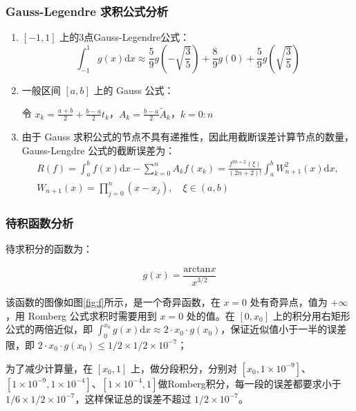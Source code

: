 \subsubsection{Gauss-Legendre 求积公式分析}

\begin{enumerate}[(1)]
    \item $[-1,1]$ 上的3点Gauss-Legendre公式：
    \begin{equation}
        \int_{-1}^1 g(x)\mathrm{d}x \approx \frac{5}{9}g(-\sqrt{\frac{3}{5}}) + \frac{8}{9}g(0) + \frac{5}{9}g(\sqrt{\frac{3}{5}})
    \end{equation}

    \item 一般区间 $[a,b]$ 上的 Gauss 公式：
    
    令 $x_k = \frac{a+b}{2}+\frac{b-a}{2}t_k$，$A_k = \frac{b-a}{2}\tilde{A}_k$，$k=0:n$

    \item 由于 Gauss 求积公式的节点不具有递推性，因此用截断误差计算节点的数量， Gauss-Lengdre 公式的截断误差为：
    \begin{multline}
        R(f) = \int _a^b f(x)\mathrm{d}x - \sum\nolimits_{k=0}^n A_kf(x_k) = \frac{f^{2n+2}(\xi)}{(2n+2)!} \int_a^b W_{n+1}^2(x)\mathrm{d}x, \\
        W_{n+1}(x) = \prod\nolimits_{j=0}^n (x-x_j), \quad \xi \in (a,b)
    \end{multline}

\end{enumerate}

\subsubsection{待积函数分析}

待求积分的函数为：

\begin{equation}
    g(x) = \frac{\mathrm{arctan}x}{x^{3/2}}
\end{equation}

该函数的图像如图\ref{fig:f}所示，是一个奇异函数，在 $x=0$ 处有奇异点，值为 $+\infty$，用 Romberg 公式求积时需要用到 $x=0$ 处的值。在 $[0,x_0]$ 上的积分用右矩形公式的两倍近似，即 $\int_0^{x_0} g(x) \mathrm{d}x \approx 2\cdot x_0 \cdot g(x_0) $，保证近似值小于一半的误差限，即 $2\cdot x_0 \cdot g(x_0) \leq 1/2 \times 1/2 \times 10^{-7}$；

为了减少计算量，在 $[x_0, 1]$ 上，做分段积分，分别对 $[x_0,1\times 10^{-9}]$、$[1\times 10^{-9},1\times 10^{-4}]$、$[1\times 10^{-4},1]$做Romberg积分，每一段的误差都要求小于 $1/6 \times 1/2 \times 10^{-7}$，这样保证总的误差不超过 $ 1/2 \times 10^{-7}$。

